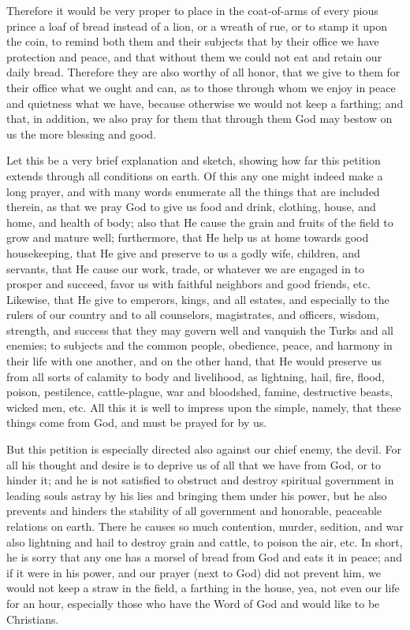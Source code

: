 Therefore it would be very proper to place in the coat-of-arms of
every pious prince a loaf of bread instead of a lion, or a wreath of
rue, or to stamp it upon the coin, to remind both them and their
subjects that by their office we have protection and peace, and that
without them we could not eat and retain our daily bread. Therefore
they are also worthy of all honor, that we give to them for their
office what we ought and can, as to those through whom we enjoy in
peace and quietness what we have, because otherwise we would not keep a
farthing; and that, in addition, we also pray for them that through
them God may bestow on us the more blessing and good.

Let this be a very brief explanation and sketch, showing how far this
petition extends through all conditions on earth. Of this any one might
indeed make a long prayer, and with many words enumerate all the things
that are included therein, as that we pray God to give us food and
drink, clothing, house, and home, and health of body; also that He
cause the grain and fruits of the field to grow and mature well;
furthermore, that He help us at home towards good housekeeping, that He
give and preserve to us a godly wife, children, and servants, that He
cause our work, trade, or whatever we are engaged in to prosper and
succeed, favor us with faithful neighbors and good friends, etc.
Likewise, that He give to emperors, kings, and all estates, and
especially to the rulers of our country and to all counselors,
magistrates, and officers, wisdom, strength, and success that they may
govern well and vanquish the Turks and all enemies; to subjects and the
common people, obedience, peace, and harmony in their life with one
another, and on the other hand, that He would preserve us from all
sorts of calamity to body and livelihood, as lightning, hail, fire,
flood, poison, pestilence, cattle-plague, war and bloodshed, famine,
destructive beasts, wicked men, etc. All this it is well to impress
upon the simple, namely, that these things come from God, and must be
prayed for by us.

But this petition is especially directed also against our chief enemy,
the devil. For all his thought and desire is to deprive us of all that
we have from God, or to hinder it; and he is not satisfied to obstruct
and destroy spiritual government in leading souls astray by his lies
and bringing them under his power, but he also prevents and hinders the
stability of all government and honorable, peaceable relations on
earth.
There he causes so much contention, murder, sedition, and war also
lightning and hail to destroy grain and cattle, to poison the air, etc.
In short, he is sorry that any one has a morsel of bread from God and
eats it in peace; and if it were in his power, and our prayer (next to
God) did not prevent him, we would not keep a straw in the field, a
farthing in the house, yea, not even our life for an hour, especially
those who have the Word of God and would like to be Christians.

